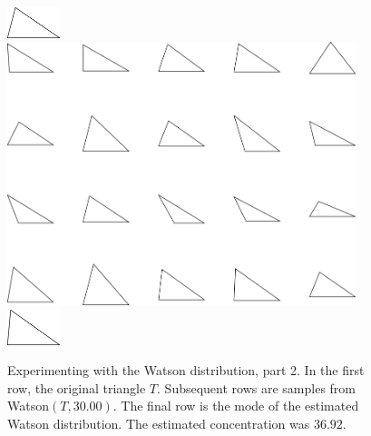 \begin{figure}
\includegraphics[width=0.6in]{output/1.models/test_watson/watson_2_true.png}\\ 
\includegraphics[width=4in]{output/1.models/test_watson/watson_2_samples.png}\\ 
\includegraphics[width=0.6in]{output/1.models/test_watson/watson_2_est.png}
\caption{Experimenting with the Watson distribution, part 2. In the first row, the original triangle $T$. Subsequent rows are samples from Watson$(T,30.00)$. The final row is the mode of the estimated Watson distribution. The estimated concentration was $36.92$.}
\label{fig-watson-2}
\end{figure}


